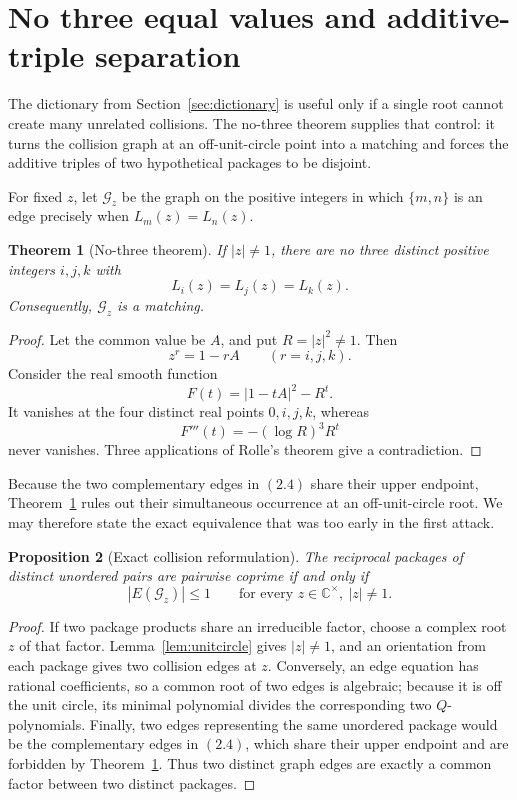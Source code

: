 \documentclass[11pt]{article}
\newtheorem{theorem}{Theorem}[section]
\newtheorem{proposition}[theorem]{Proposition}
\theoremstyle{definition}
\newcommand{\C}{\mathbb C}
\begin{document}
\section{No three equal values and additive-triple separation}

The dictionary from Section~\ref{sec:dictionary} is useful only if a single root cannot create many unrelated collisions.  The no-three theorem supplies that control: it turns the collision graph at an off-unit-circle point into a matching and forces the additive triples of two hypothetical packages to be disjoint.

For fixed \(z\), let \(\mathcal G_z\) be the graph on the positive integers in
which \(\{m,n\}\) is an edge precisely when \(L_m(z)=L_n(z)\).

\begin{theorem}[No-three theorem]\label{thm:nothree}
If \(|z|\neq1\), there are no three distinct positive integers \(i,j,k\) with
\[
 L_i(z)=L_j(z)=L_k(z).
\]
Consequently, \(\mathcal G_z\) is a matching.
\end{theorem}

\begin{proof}
Let the common value be \(A\), and put \(R=|z|^2\neq1\).  Then
\[
 z^r=1-rA\qquad(r=i,j,k).
\]
Consider the real smooth function
\[
 F(t)=|1-tA|^2-R^t.
\]
It vanishes at the four distinct real points \(0,i,j,k\), whereas
\[
 F'''(t)=-(\log R)^3R^t
\]
never vanishes.  Three applications of Rolle's theorem give a contradiction.
\end{proof}

Because the two complementary edges in \((2.4)\) share their upper endpoint,
Theorem~\ref{thm:nothree} rules out their simultaneous occurrence at an
off-unit-circle root.  We may therefore state the exact equivalence that was too early
in the first attack.

\begin{proposition}[Exact collision reformulation]\label{prop:equivalence}
The reciprocal packages of distinct unordered pairs are pairwise coprime if
and only if
\[
 |E(\mathcal G_z)|\leq1
 \qquad\text{for every }z\in\C^\times,\ \lvert z\rvert\neq1.
 \tag{3.1}
\]
\end{proposition}

\begin{proof}
If two package products share an irreducible factor, choose a complex root
\(z\) of that factor.  Lemma~\ref{lem:unitcircle} gives \(|z|\neq1\), and
an orientation from each package gives two collision edges at \(z\).
Conversely, an edge equation has rational coefficients, so a common root of
two edges is algebraic; because it is off the unit circle, its minimal
polynomial divides the corresponding two \(Q\)-polynomials.  Finally, two
edges representing the same unordered package would be the complementary
edges in \((2.4)\), which share their upper endpoint and are forbidden by
Theorem~\ref{thm:nothree}.  Thus two distinct graph edges are exactly a common
factor between two distinct packages.
\end{proof}
\end{document}
